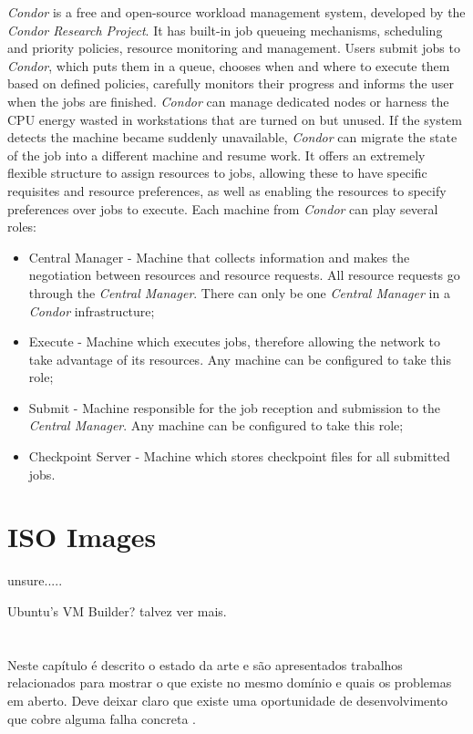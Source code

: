 \textit{Condor} is a free and open-source workload management system, developed by the \textit{Condor Research Project}.
It has built-in job queueing mechanisms, scheduling and priority policies, resource monitoring and management. Users submit jobs to \textit{Condor}, which puts them in a queue, chooses when and where to execute them based on defined policies, carefully monitors their progress and informs the user when the jobs are finished.
\textit{Condor} can manage dedicated nodes or harness the CPU energy wasted in workstations that are turned on but unused. If the system detects the machine became suddenly unavailable, \textit{Condor} can migrate the state of the job into a different machine and resume work. 
It offers an extremely flexible structure to assign resources to jobs, allowing these to have specific requisites and resource preferences, as well as enabling the resources to specify preferences over jobs to execute.
Each machine from \textit{Condor} can play several roles:
\begin{itemize}
\item Central Manager - Machine that collects information and makes the negotiation between resources and resource requests. All resource requests go through the \textit{Central Manager}. There can only be one \textit{Central Manager} in a \textit{Condor} infrastructure;
\item Execute - Machine which executes jobs, therefore allowing the network to take advantage of its resources. Any machine can be configured to take this role;
\item Submit - Machine responsible for the job reception and submission to the \textit{Central Manager}. Any machine can be configured to take this role;
\item Checkpoint Server - Machine which stores checkpoint files for all submitted jobs.\cite{jorge-ruao,condor}
\end{itemize}


\section{ISO Images} \label{iso}

unsure.....

Ubuntu's VM Builder? talvez ver mais.


\section*{}

Neste capítulo é descrito o estado da arte e são
apresentados trabalhos relacionados para mostrar o que existe no
mesmo domínio e quais os problemas em aberto.
Deve deixar claro que existe uma oportunidade de desenvolvimento que
cobre alguma falha concreta .

